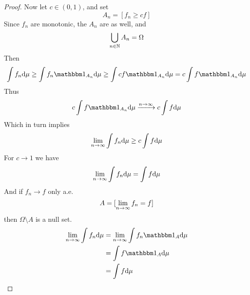 \documentclass[../../script.tex]{subfiles}
\begin{document}
\begin{proof}
    Now let $c \in (0, 1)$, and set
    \begin{equation}
        A_n = [f_n \ge cf]
    \end{equation}
    Since $f_n$ are monotonic, the $A_n$ are as well, and 
    \begin{equation}
        \bigcup_{n \in \mathbb{N}} A_n = \Omega
    \end{equation}
    Then 
    \begin{equation}
        \int f_n \dd\mu \ge \int f_n \charfun_{A_n} \dd\mu \ge \int c f \charfun_{A_n} \dd\mu = c \int f \charfun_{A_n} \dd\mu
    \end{equation}
    Thus 
    \begin{equation}
        c \int f \charfun_{A_n} \dd\mu \conv{n \rightarrow \infty} c \int f \dd\mu
    \end{equation}
    Which in turn implies 
    \begin{equation}
        \lim_{n \rightarrow \infty} \int f_n \dd\mu \ge c \int f \dd\mu 
    \end{equation}
    For $c \rightarrow 1$ we have 
    \begin{equation}
        \lim_{n \rightarrow \infty} \int f_n \dd\mu = \int f \dd\mu 
    \end{equation}
    And if $f_n \rightarrow f$ only a.e. 
    \begin{equation}
        A = [\lim_{n \rightarrow \infty} f_n = f]
    \end{equation}
    then $\Omega \setminus A$ is a null set.
    \begin{equation}
        \begin{split}
            \limn \int f_n \dd\mu &= \limn \int f_n \charfun_A \dd\mu \\
            &= \int f \charfun_A \dd\mu \\
            &= \int f \dd\mu
        \end{split}
    \end{equation}
\end{proof}
\end{document}
